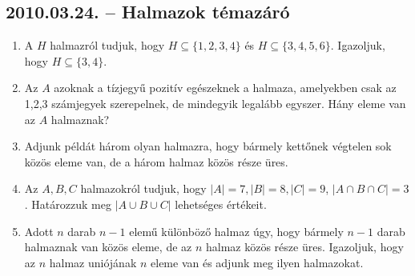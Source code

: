 \documentclass{article}
\begin{document}
\subsection*{2010.03.24. -- Halmazok témazáró}
\begin{enumerate}
\item A $H$ halmazról tudjuk, hogy $H\subseteq \{1,2,3,4\}$ és $H\subseteq \{3,4,5,6\}$. Igazoljuk, hogy $H\subseteq \{3,4\}$.
\item Az $A$ azoknak a tízjegyű pozitív egészeknek a halmaza, amelyekben csak az 1,2,3 számjegyek szerepelnek, de mindegyik legalább egyszer. Hány eleme van az $A$ halmaznak?
\item Adjunk példát három olyan halmazra, hogy bármely kettőnek végtelen sok közös eleme van, de a három halmaz közös része üres.
\item Az $A,B,C$ halmazokról tudjuk, hogy $|A|=7, |B|=8, |C|=9$, $|A\cap B \cap C|=3$. Határozzuk meg $|A\cup B \cup C|$ lehetséges értékeit.
\item Adott $n$ darab $n-1$ elemű különböző halmaz úgy, hogy bármely $n-1$ darab halmaznak van közös eleme, de az $n$ halmaz közös része üres. Igazoljuk, hogy az $n$ halmaz uniójának $n$ eleme van és adjunk meg ilyen halmazokat.
\end{enumerate}
\end{document}
